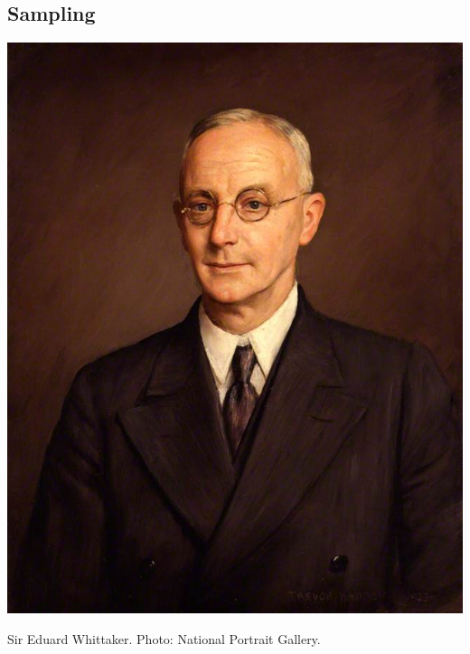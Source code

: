\subsection{Sampling}
\begin{marginfigure}[3cm]
  \begin{center}
    \includegraphics[width=\textwidth]{ch09/figures/whittaker.jpg}
  \end{center}
  \caption{Sir Eduard Whittaker. Photo: National Portrait Gallery.}
\end{marginfigure}

